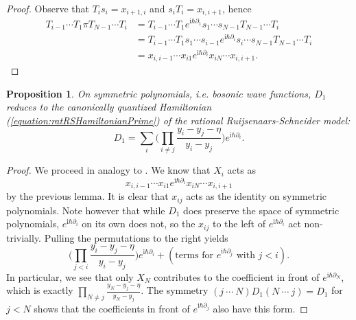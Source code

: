 \documentclass[11pt]{report}
\newtheorem{prop}[theorem]{Proposition}
\theoremstyle{definition}
\theoremstyle{remark}
\theoremstyle{remark}
\newcommand{\I}{\mathrm{i}}
\begin{document}
\begin{proof}
Observe that $T_i s_i = x_{i+1,i}$ and $s_i T_i = x_{i,i+1}$, hence
\begin{align*}
T_{i-1} \cdots T_1 \pi T_{N-1} \cdots T_i
&= T_{i-1} \cdots T_1 e^{\I \hbar \partial_1} s_1 \cdots s_{N-1} T_{N-1} \cdots T_i \\
&= T_{i-1} \cdots T_1 s_1 \cdots s_{i-1} e^{\I \hbar \partial_i} s_i \cdots s_{N-1} T_{N-1} \cdots T_i \\
&= x_{i,i-1} \cdots x_{i1} e^{\I \hbar \partial_i} x_{iN} \cdots x_{i,i+1}.
\end{align*}
\end{proof}

\begin{prop}
On symmetric polynomials, \emph{i.e.} bosonic wave functions, $D_1$ reduces to the canonically quantized Hamiltonian (\ref{equation:ratRSHamiltonianPrime}) of the rational Ruijsenaars-Schneider model:
\begin{equation*}
D_1 = \sum_i \bigg( \prod_{i \neq j} \frac{y_i-y_j-\eta}{y_i-y_j} \bigg) e^{\I \hbar \partial_i}.
\end{equation*}
\end{prop}

\begin{proof}
We proceed in analogy to \cite{article:jimbo:1995}. We know that $X_i$ acts as
\begin{equation*}
x_{i,i-1} \cdots x_{i1} e^{\I \hbar \partial_i} x_{iN} \cdots x_{i,i+1}
\end{equation*}
by the previous lemma. It is clear that $x_{ij}$ acts as the identity on symmetric polynomials. Note however that while $D_1$ does preserve the space of symmetric polynomials, $e^{\I \hbar \partial_i}$ on its own does not, so the $x_{ij}$ to the left of $e^{\I \hbar \partial_i}$ act non-trivially. Pulling the permutations to the right yields
\begin{equation*}
\bigg( \prod_{j < i} \frac{y_i-y_j-\eta}{y_i-y_j} \bigg) e^{\I \hbar \partial_i} + (\text{terms for } e^{\I \hbar \partial_j} \text{ with } j < i).
\end{equation*}
In particular, we see that only $X_N$ contributes to the coefficient in front of $e^{\I \hbar \partial_N}$, which is exactly $\prod_{N \neq j} \frac{y_N-y_j-\eta}{y_N-y_j}$. The symmetry $(j \ \cdots \ N) D_1 (N \ \cdots \ j) = D_1$ for $j < N$ shows that the coefficients in front of $e^{\I \hbar \partial_j}$ also have this form.
\end{proof}
\end{document}
